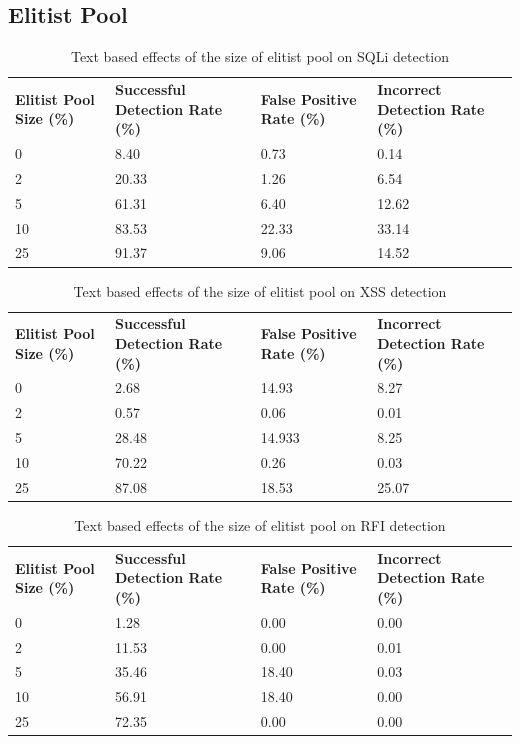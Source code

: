\begin{appendices}
\newpage
\subsection{Elitist Pool}

\begin{table}[h]
	\centering
	\begin{tabular}{|p{1.5in}|p{1in}|p{1in}|p{1in}|}
	\hline
	\textbf{Elitist Pool Size (\%)} & \textbf{Successful Detection Rate (\%)} & \textbf{False Positive Rate (\%)} & \textbf{Incorrect Detection Rate (\%)}  \\
	\hhline{|=|=|=|=|}
	0 & 8.40 & 0.73 & 0.14 \\
	\hline
	2 & 20.33 & 1.26 & 6.54 \\
	\hline
	5 & 61.31 & 6.40 & 12.62 \\
	\hline
	10 & 83.53 & 22.33 & 33.14 \\
	\hline
	25 & 91.37 & 9.06 & 14.52 \\
	\hline
	\end{tabular}
	\caption{Text based effects of the size of elitist pool on SQLi detection}
\end{table}

\begin{table}[h]
	\centering
	\begin{tabular}{|p{1.5in}|p{1in}|p{1in}|p{1in}|}
	\hline
	\textbf{Elitist Pool Size (\%)} & \textbf{Successful Detection Rate (\%)} & \textbf{False Positive Rate (\%)} & \textbf{Incorrect Detection Rate (\%)}  \\
	\hhline{|=|=|=|=|}
	0 & 2.68 & 14.93 & 8.27 \\
	\hline
	2 & 0.57 & 0.06 & 0.01 \\
	\hline
	5 & 28.48 & 14.933 & 8.25 \\
	\hline
	10 & 70.22 & 0.26 & 0.03 \\
	\hline
	25 & 87.08 & 18.53 & 25.07 \\
	\hline
	\end{tabular}
	\caption{Text based effects of the size of elitist pool on XSS detection}
\end{table}

\begin{table}[h]
	\centering
	\begin{tabular}{|p{1.5in}|p{1in}|p{1in}|p{1in}|}
	\hline
	\textbf{Elitist Pool Size (\%)} & \textbf{Successful Detection Rate (\%)} & \textbf{False Positive Rate (\%)} & \textbf{Incorrect Detection Rate (\%)}  \\
	\hhline{|=|=|=|=|}
	0 & 1.28 & 0.00 & 0.00 \\
	\hline
	2 & 11.53 & 0.00 & 0.01 \\
	\hline
	5 & 35.46 & 18.40 & 0.03 \\
	\hline
	10 & 56.91 & 18.40 & 0.00 \\
	\hline
	25 & 72.35 & 0.00 & 0.00 \\
	\hline
	\end{tabular}
	\caption{Text based effects of the size of elitist pool on RFI detection}
\end{table}


\end{appendices}
